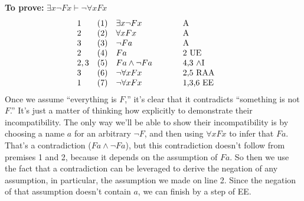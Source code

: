 \medskip \noindent \textbf{To prove:} $\exists
x\neg Fx\vdash\neg\forall xFx$
\[ \begin{array}{l l >{$}p{2.5cm}<{$} p{2cm}}
     1 & (1) & \exists x\neg Fx & A \\
     2 & (2) & \forall xFx      & A \\
     3 & (3) & \neg Fa          & A \\
     2 & (4) & Fa               & 2 UE \\
     2,3 & (5) & Fa\wedge\neg Fa    & 4,3 $\wedge$I \\
     3 & (6) & \neg\forall xFx      & 2,5 RAA \\
     1 & (7) & \neg\forall xFx & 1,3,6 EE \end{array} \] Once we
 assume ``everything is $F$,'' it's clear that it contradicts ``something is not $F$.'' It's just a matter of thinking how explicitly to demonstrate their incompatibility.  The only way we'll be able to show their incompatibility is by choosing a name $a$ for an arbitrary $\neg F$, and then using $\forall xFx$ to infer that $Fa$.  That's a contradiction ($Fa\wedge\neg Fa$), but this contradiction doesn't follow from premises 1 and 2, because it depends on the assumption of $Fa$.  So then we use the fact that a contradiction can be leveraged to derive the negation of any assumption, in particular, the assumption we made on line 2.  Since the negation of that assumption doesn't contain $a$, we can finish by a step of EE.
 


